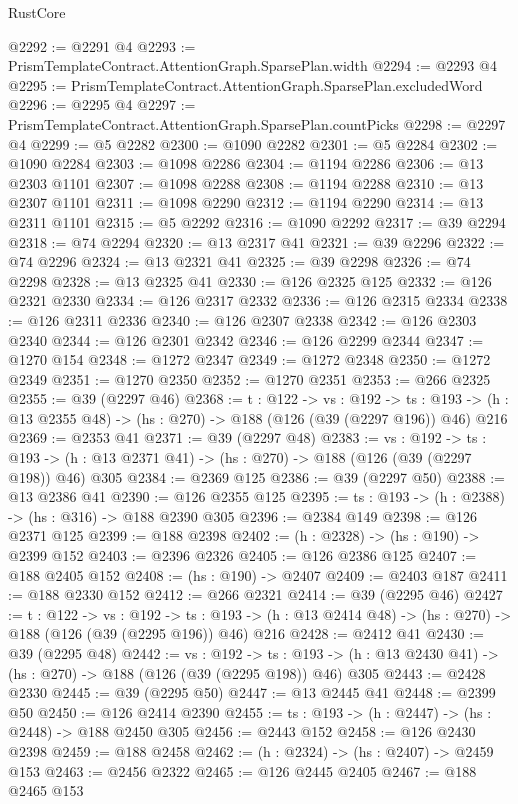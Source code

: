 \begin{lexlean}{RustCore}
\begin{coremodule}
@2292 := @2291 @4
@2293 := PrismTemplateContract.AttentionGraph.SparsePlan.width
@2294 := @2293 @4
@2295 := PrismTemplateContract.AttentionGraph.SparsePlan.excludedWord
@2296 := @2295 @4
@2297 := PrismTemplateContract.AttentionGraph.SparsePlan.countPicks
@2298 := @2297 @4
@2299 := @5 @2282
@2300 := @1090 @2282
@2301 := @5 @2284
@2302 := @1090 @2284
@2303 := @1098 @2286
@2304 := @1194 @2286
@2306 := @13 @2303 @1101
@2307 := @1098 @2288
@2308 := @1194 @2288
@2310 := @13 @2307 @1101
@2311 := @1098 @2290
@2312 := @1194 @2290
@2314 := @13 @2311 @1101
@2315 := @5 @2292
@2316 := @1090 @2292
@2317 := @39 @2294
@2318 := @74 @2294
@2320 := @13 @2317 @41
@2321 := @39 @2296
@2322 := @74 @2296
@2324 := @13 @2321 @41
@2325 := @39 @2298
@2326 := @74 @2298
@2328 := @13 @2325 @41
@2330 := @126 @2325 @125
@2332 := @126 @2321 @2330
@2334 := @126 @2317 @2332
@2336 := @126 @2315 @2334
@2338 := @126 @2311 @2336
@2340 := @126 @2307 @2338
@2342 := @126 @2303 @2340
@2344 := @126 @2301 @2342
@2346 := @126 @2299 @2344
@2347 := @1270 @154
@2348 := @1272 @2347
@2349 := @1272 @2348
@2350 := @1272 @2349
@2351 := @1270 @2350
@2352 := @1270 @2351
@2353 := @266 @2325
@2355 := @39 (@2297 @46)
@2368 := {t : @122} ->
  {vs : @192} ->
  {ts : @193} -> (h : @13 @2355 @48) -> (hs : @270) -> @188 (@126 (@39 (@2297 @196)) @46) @216
@2369 := @2353 @41
@2371 := @39 (@2297 @48)
@2383 := {vs : @192} ->
  {ts : @193} -> (h : @13 @2371 @41) -> (hs : @270) -> @188 (@126 (@39 (@2297 @198)) @46) @305
@2384 := @2369 @125
@2386 := @39 (@2297 @50)
@2388 := @13 @2386 @41
@2390 := @126 @2355 @125
@2395 := {ts : @193} -> (h : @2388) -> (hs : @316) -> @188 @2390 @305
@2396 := @2384 @149
@2398 := @126 @2371 @125
@2399 := @188 @2398
@2402 := (h : @2328) -> (hs : @190) -> @2399 @152
@2403 := @2396 @2326
@2405 := @126 @2386 @125
@2407 := @188 @2405 @152
@2408 := (hs : @190) -> @2407
@2409 := @2403 @187
@2411 := @188 @2330 @152
@2412 := @266 @2321
@2414 := @39 (@2295 @46)
@2427 := {t : @122} ->
  {vs : @192} ->
  {ts : @193} -> (h : @13 @2414 @48) -> (hs : @270) -> @188 (@126 (@39 (@2295 @196)) @46) @216
@2428 := @2412 @41
@2430 := @39 (@2295 @48)
@2442 := {vs : @192} ->
  {ts : @193} -> (h : @13 @2430 @41) -> (hs : @270) -> @188 (@126 (@39 (@2295 @198)) @46) @305
@2443 := @2428 @2330
@2445 := @39 (@2295 @50)
@2447 := @13 @2445 @41
@2448 := @2399 @50
@2450 := @126 @2414 @2390
@2455 := {ts : @193} -> (h : @2447) -> (hs : @2448) -> @188 @2450 @305
@2456 := @2443 @152
@2458 := @126 @2430 @2398
@2459 := @188 @2458
@2462 := (h : @2324) -> (hs : @2407) -> @2459 @153
@2463 := @2456 @2322
@2465 := @126 @2445 @2405
@2467 := @188 @2465 @153

\end{coremodule}
\end{lexlean}
